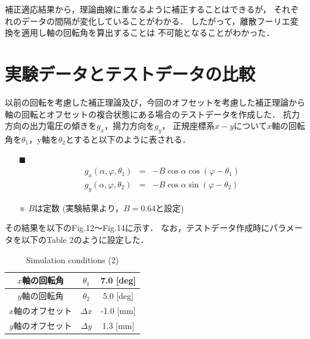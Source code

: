 \documentclass[twocolumn,a4j]{jsarticle}
\begin{document}
補正適応結果から，理論曲線に重なるように補正することはできるが，
それぞれのデータの間隔が変化していることがわかる．
したがって，離散フーリエ変換を適用し軸の回転角を算出することは
不可能となることがわかった．

\newpage

\section{実験データとテストデータの比較}

以前の回転を考慮した補正理論及び，今回のオフセットを考慮した補正理論から
軸の回転とオフセットの複合状態にある場合のテストデータを作成した．
抗力方向の出力電圧の傾きを$g_x$，揚力方向を$g_y$，
正規座標系$x-y$について$x$軸の回転角を$\theta_1$，y軸を$\theta_2$とすると以下のように表される．

\begin{itemize}
    \item [$\blacksquare$] 
          \begin{eqnarray*}
            g_x(\alpha , \varphi , \theta_1) &=& - B \cos \alpha \cos \left(\varphi - \theta_1\right) \\
            g_y(\alpha , \varphi , \theta_2) &=& - B \cos \alpha \sin \left(\varphi - \theta_2\right)
          \end{eqnarray*}
    \item [※] $B$は定数 (実験結果より，$B=0.64$と設定)
\end{itemize}

その結果を以下のFig.12～Fig.14に示す．
なお，テストデータ作成時にパラメータを以下のTable 2のように設定した．

\begin{table}[htbp]
    \begin{center}
        \caption{Simulation conditions (2)}
        \begin{tabular}{|p{30mm}|p{20mm}|p{30mm}|}
            \hline
            \multicolumn{1}{|c|}{$x$軸の回転角}       & \multicolumn{1}{|c|}{$\theta_1$} & \multicolumn{1}{|c|}{7.0 [deg]}             \\ \hline
            \multicolumn{1}{|c|}{$y$軸の回転角}       & \multicolumn{1}{|c|}{$\theta_2$} & \multicolumn{1}{|c|}{5.0 [deg]}             \\ \hline
            \multicolumn{1}{|c|}{$x$軸のオフセット}   & \multicolumn{1}{|c|}{$\Delta x$} & \multicolumn{1}{|c|}{-1.0 [mm]}             \\ \hline
            \multicolumn{1}{|c|}{$y$軸のオフセット}   & \multicolumn{1}{|c|}{$\Delta y$} & \multicolumn{1}{|c|}{1.3 [mm]}             \\ \hline
        \end{tabular}
    \end{center}
\end{table}
\end{document}
